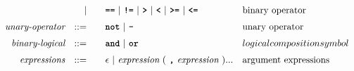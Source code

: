 \begin{alignat*}{9}
&&                      && |  &\quad && \textbf{\texttt{==}}\ |\ \textbf{\texttt{!=}}\ |\ \texttt{\textbf{>}}\ |\ \texttt{\textbf{<}}\ |\ \texttt{\textbf{>=}}\ |\ \texttt{\textbf{<=}}     && \textrm{binary operator}\\[1mm]
&& \textit{unary-operator}    
                        && ::= &\quad && \textbf{\texttt{not}}\ |\ \textbf{\texttt{-}}
                        && \textrm{unary operator}\\[1mm]
&& \textit{binary-logical}   && ::=  &\quad &&  \textbf{\texttt{and}}\ |\ \texttt{\textbf{or}}
                                          && {logical composition symbol}\\[1mm]
&& \textit{expressions}  && ::= &\quad && \epsilon\ | \ \textit{expression}\ (
                                                               \ \textbf{\texttt{,}} \
                                                                 \textit{expression} \ 
                                                                      ) ...
                                                            && \textrm{argument expressions}
\end{alignat*}

